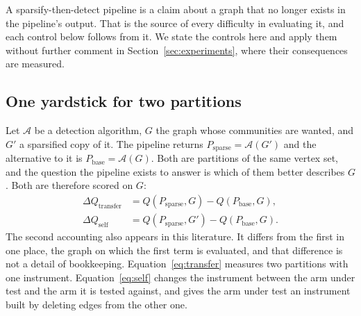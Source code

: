 %
%
%

A sparsify-then-detect pipeline is a claim about a graph that no longer exists in
the pipeline's output. That is the source of every difficulty in evaluating it,
and each control below follows from it. We state the controls here and apply them
without further comment in Section~\ref{sec:experiments}, where their
consequences are measured.

\subsection{One yardstick for two partitions}\label{sec:protocol:transfer}

Let $\mathcal{A}$ be a detection algorithm, $G$ the graph whose communities are
wanted, and $G'$ a sparsified copy of it. The pipeline returns
$P_{\mathrm{sparse}} = \mathcal{A}(G')$ and the alternative to it is
$P_{\mathrm{base}} = \mathcal{A}(G)$. Both are partitions of the same vertex set,
and the question the pipeline exists to answer is which of them better describes
$G$. Both are therefore scored on $G$:
\begin{align}
\Delta Q_{\mathrm{transfer}} &= Q(P_{\mathrm{sparse}}, G) - Q(P_{\mathrm{base}},
G), \label{eq:transfer}\\
\Delta Q_{\mathrm{self}} &= Q(P_{\mathrm{sparse}}, G') - Q(P_{\mathrm{base}}, G).
\label{eq:self}
\end{align}
The second accounting also appears in this literature. It differs from the first
in one place, the graph on which the first term is evaluated, and that difference
is not a detail of bookkeeping. Equation~\eqref{eq:transfer} measures two
partitions with one instrument. Equation~\eqref{eq:self} changes the instrument
between the arm under test and the arm it is tested against, and gives the arm
under test an instrument built by deleting edges from the other one.

